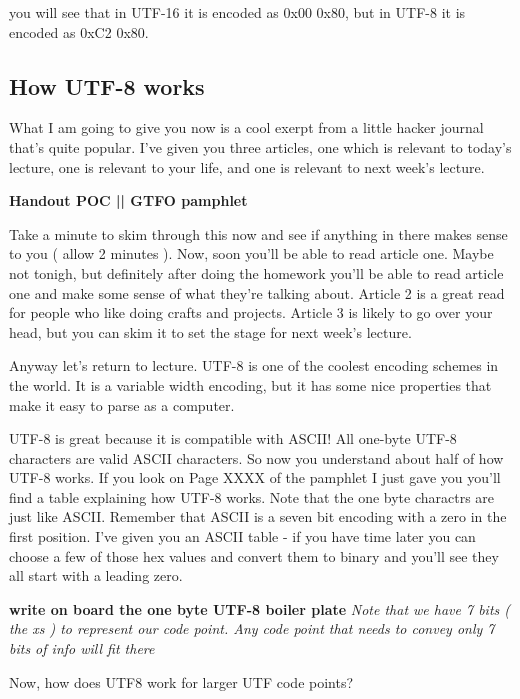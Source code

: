 \documentclass[12pt]{article}
\begin{document}
you will see that in UTF-16 it is encoded as 0x00 0x80, but in UTF-8 it is encoded as 0xC2 0x80.

\subsection{How UTF-8 works}
What I am going to give you now is a cool exerpt from a little hacker journal that's quite popular. I've given you three articles, one which is relevant to today's lecture, one is relevant to your life, and one is relevant to next week's lecture.

\begin{center}
\textbf{Handout POC || GTFO pamphlet}
\end{center}

Take a minute to skim through this now and see if anything in there makes sense to you ( allow 2 minutes ). Now, soon you'll be able to read article one. Maybe not tonigh, but definitely after doing the homework you'll be able to read article one and make some sense of what they're talking about. Article 2 is a great read for people who like doing crafts and projects. Article 3 is likely to go over your head, but you can skim it to set the stage for next week's lecture.

Anyway let's return to lecture. UTF-8 is one of the coolest encoding schemes in the world. It is a variable width encoding, but it has some nice properties that make it easy to parse as a computer.

UTF-8 is great because it is compatible with ASCII! All one-byte UTF-8 characters are valid ASCII characters. So now you understand about half of how UTF-8 works. If you look on Page XXXX of the pamphlet I just gave you you'll find a table explaining how UTF-8 works. Note that the one byte charactrs are just like ASCII. Remember that ASCII is a seven bit encoding with a zero in the first position. I've given you an ASCII table - if you have time later you can choose a few of those hex values and convert them to binary and you'll see they all start with a leading zero.

\begin{center}
\textbf{write on board the one byte UTF-8 boiler plate}
\textit{Note that we have 7 bits ( the xs ) to represent our code point. Any code point that needs to convey only 7 bits of info will fit there}
\end{center}

Now, how does UTF8 work for larger UTF code points?
\end{document}
